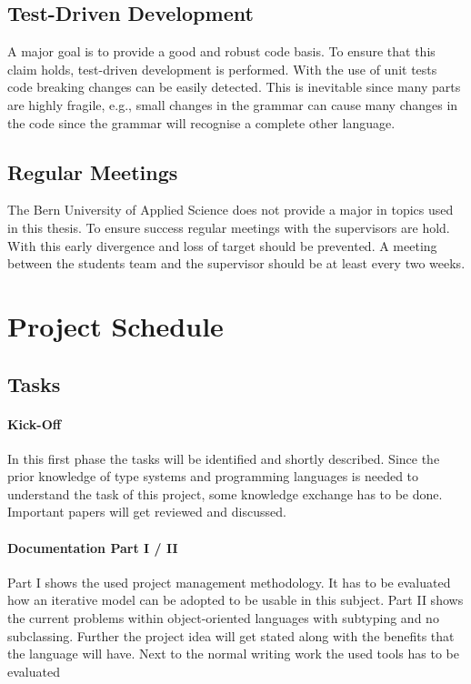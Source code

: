 \subsection{Test-Driven Development}
A major goal is to provide a good and robust code basis. To ensure that
this claim holds, test-driven development is performed. With the use of
unit tests code breaking changes can be easily detected. This is inevitable
since many parts are highly fragile, e.g., small changes in the grammar can
cause many changes in the code since the grammar will recognise a complete
other language.

\subsection{Regular Meetings}
The Bern University of Applied Science does not provide a major in
topics used in this thesis. To ensure success regular meetings with the
supervisors are hold. With this early divergence and loss of target should
be prevented. A meeting between the students team and the supervisor
should be at least every two weeks.

\section{Project Schedule}
\subsection{Tasks}
\paragraph{Kick-Off}
In this first phase the tasks will be identified and shortly
described. Since the prior knowledge of type systems and programming
languages is needed to understand the task of this project, some
knowledge exchange has to be done. Important papers will get reviewed
and discussed.

\paragraph{Documentation Part I / II}
Part I shows the used project management methodology. It has to be
evaluated how an iterative model can be adopted to be usable in this
subject. Part II shows the current problems within object-oriented
languages with subtyping and no subclassing. Further the project idea
will get stated along with the benefits that the language will have. Next
to the normal writing work the used tools has to be evaluated

